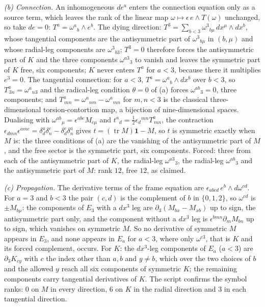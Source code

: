\emph{(b) Connection.} An inhomogeneous $de^a$ enters the connection equation only as a source term, which leaves the rank of the linear map $\omega \mapsto \epsilon\,e\wedge T(\omega)$ unchanged, so take $de = 0$: $T^a = \omega^{a}{}_{b}\wedge e^b$. The dying direction: $T^3 = \sum_{b<3}\omega^{3}{}_{b\mu}\,dx^\mu\wedge dx^b$, whose tangential components are the antisymmetric part of $\omega^{3}{}_{b\mu}$ in $(b,\mu)$ and whose radial-leg components are $\omega^{3}{}_{b3}$; $T^3 = 0$ therefore forces the antisymmetric part of $K$ and the three components $\omega^{a3}{}_{3}$ to vanish and leaves the symmetric part of $K$ free, six components; $K$ never enters $T^a$ for $a < 3$, because there it multiplies $e^3 = 0$. The tangential connection: for $a < 3$, $T^a = \omega^{a}{}_{b}\wedge dx^b$ over $b < 3$, so $T^a_{\,3n} = \omega^{a}{}_{n3}$ and the radical-leg condition $\theta = 0$ of (a) forces $\omega^{ab}{}_{3} = 0$, three components; and $T^a_{\,mn} = \omega^{a}{}_{nm} - \omega^{a}{}_{mn}$ for $m,n < 3$ is the classical three-dimensional torsion-contortion map, a bijection of nine-dimensional spaces. Dualising with $\omega^{ab}{}_{\mu} = \epsilon^{abc}M_{c\mu}$ and $t^{a}{}_{d} = \tfrac12\epsilon_{d}{}^{mn}T^a_{\,mn}$, the contraction $\epsilon_{dmn}\epsilon^{amc} = \delta^a_d\delta^c_n - \delta^c_d\delta^a_n$ gives $t = (\operatorname{tr}M)\mathbf{1} - M$, so $t$ is symmetric exactly when $M$ is: the three conditions of (a) are the vanishing of the antisymmetric part of $M$, and the free sector is the symmetric part, six components. Forced: three from each of the antisymmetric part of $K$, the radial-leg $\omega^{a3}{}_{3}$, the radial-leg $\omega^{ab}{}_{3}$ and the antisymmetric part of $M$: rank $12$, free $12$, as claimed.

\emph{(c) Propagation.} The derivative terms of the frame equation are $\epsilon_{abcd}\,e^b\wedge d\omega^{cd}$. For $a = 3$ and $b < 3$ the pair $(c,d)$ is the complement of $b$ in $\{0,1,2\}$, so $\omega^{cd}$ is $\pm M_{b\mu}$: the components of $E_3$ with a $dx^3$ leg are $\partial_3(M_{bx} - M_{xb})$ up to sign, the antisymmetric part only, and the component without a $dx^3$ leg is $\epsilon^{bmn}\partial_m M_{bn}$ up to sign, which vanishes on symmetric $M$. So no derivative of symmetric $M$ appears in $E_3$, and none appears in $E_a$ for $a < 3$, where only $\omega^{c3}$, that is $K$ and its forced complement, occurs. For $K$: the $dx^3$-leg components of $E_a$ ($a < 3$) are $\partial_3 K_{c y}$ with $c$ the index other than $a, b$ and $y \neq b$, which over the two choices of $b$ and the allowed $y$ reach all six components of symmetric $K$; the remaining components carry tangential derivatives of $K$. The script confirms the symbol ranks: $0$ on $M$ in every direction, $6$ on $K$ in the radial direction and $3$ in each tangential direction.

